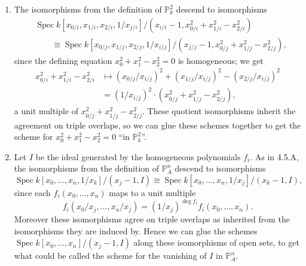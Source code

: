 \documentclass{report}
\renewcommand{\P}{\mathbb{P}} %
\DeclareMathOperator{\Spec}{Spec}
\begin{document}
\begin{enumerate}[label=\textbf{4.5.\Alph*.}]
	\item The isomorphisms from the definition of $\P^2_k$ descend to
	      isomorphisms
	      \begin{align*}
		       & \Spec k[x_{0/i},x_{1/i},x_{2/i},1/x_{j/i}]/(x_{i/i}-1,x_{0/i}^2+x_{1/i}^2-x_{2/i}^2)              \\
		       & \qquad\cong \Spec k[x_{0/j},x_{1/j},x_{2/j},1/x_{i/j}]/(x_{j/j}-1,x_{0/j}^2+x_{1/j}^2-x_{2/j}^2),
	      \end{align*}
	      since the defining equation $x_0^2+x_1^2-x_2^2=0$ is homogeneous; we get
	      \begin{align*}
		      x_{0/i}^2+x_{1/i}^2-x_{2/i}^2
		       & \mapsto (x_{0/j}/x_{i/j})^2 + (x_{1/j}/x_{i/j})^2 - (x_{2/j}/x_{i/j})^2 \\
		       & = (1/x_{i/j})^2\cdot(x_{0/j}^2 + x_{1/j}^2 - x_{2/j}^2),
	      \end{align*}
	      a unit multiple of $x_{0/j}^2 + x_{1/j}^2 - x_{2/j}^2$. These quotient
	      isomorphisms inherit the agreement on triple overlaps, so we can glue
	      these schemes together to get the scheme for $x_0^2+x_1^2-x_2^2=0$
	      ``in $\P^2_k$''.

	\item Let $I$ be the ideal generated by the homogeneous polynomials $f_i$. As
	      in 4.5.A, the isomorphisms from the definition of $\P^n_A$ descend to
	      isomorphisms
	      \begin{equation*}
		      \Spec k[x_0,\ldots,x_n,1/x_k]/(x_j-1,I)
		      \cong \Spec k[x_0,\ldots,x_n,1/x_j]/(x_k-1,I),
	      \end{equation*}
	      since each $f_i(x_0,\ldots,x_n)$ maps to a unit multiple
	      \begin{equation*}
		      f_i(x_0/x_j,\ldots,x_n/x_j)
		      = (1/x_j)^{\deg f_i}f_i(x_0,\ldots,x_n).
	      \end{equation*}
	      Moreover these isomorphisms agree on triple overlaps as inherited from
	      the isomorphisms they are induced by. Hence we can glue the schemes
	      $\Spec k[x_0,\ldots,x_n]/(x_j-1,I)$ along these isomorphisms of open
	      sets, to get what could be called the scheme for the vanishing of $I$ in
	      $\P^n_A$.


\end{enumerate}
\end{document}
